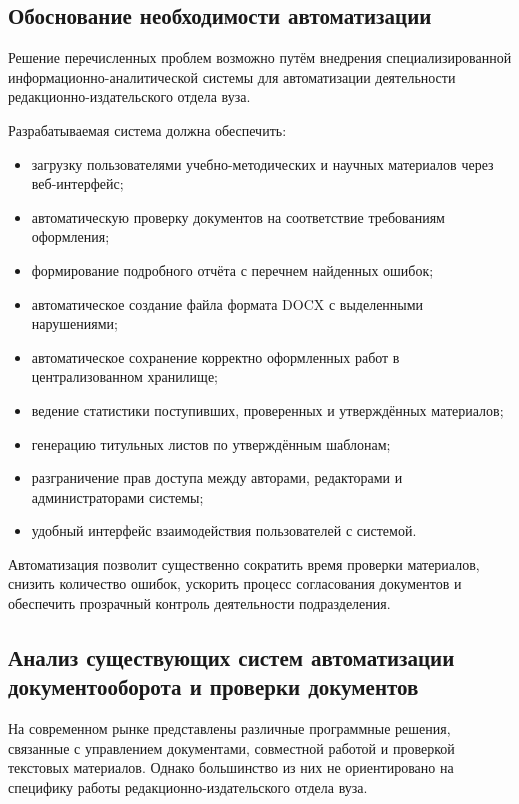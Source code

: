\subsection{Обоснование необходимости автоматизации}

Решение перечисленных проблем возможно путём внедрения специализированной информационно-аналитической системы для автоматизации деятельности редакционно-издательского отдела вуза.

Разрабатываемая система должна обеспечить:

\begin{itemize}
	\item загрузку пользователями учебно-методических и научных материалов через веб-интерфейс;
	\item автоматическую проверку документов на соответствие требованиям оформления;
	\item формирование подробного отчёта с перечнем найденных ошибок;
	\item автоматическое создание файла формата DOCX с выделенными нарушениями;
	\item автоматическое сохранение корректно оформленных работ в централизованном хранилище;
	\item ведение статистики поступивших, проверенных и утверждённых материалов;
	\item генерацию титульных листов по утверждённым шаблонам;
	\item разграничение прав доступа между авторами, редакторами и администраторами системы;
	\item удобный интерфейс взаимодействия пользователей с системой.
\end{itemize}

Автоматизация позволит существенно сократить время проверки материалов, снизить количество ошибок, ускорить процесс согласования документов и обеспечить прозрачный контроль деятельности подразделения.

\subsection{Анализ существующих систем автоматизации документооборота и проверки документов}

На современном рынке представлены различные программные решения, связанные с управлением документами, совместной работой и проверкой текстовых материалов. Однако большинство из них не ориентировано на специфику работы редакционно-издательского отдела вуза.

